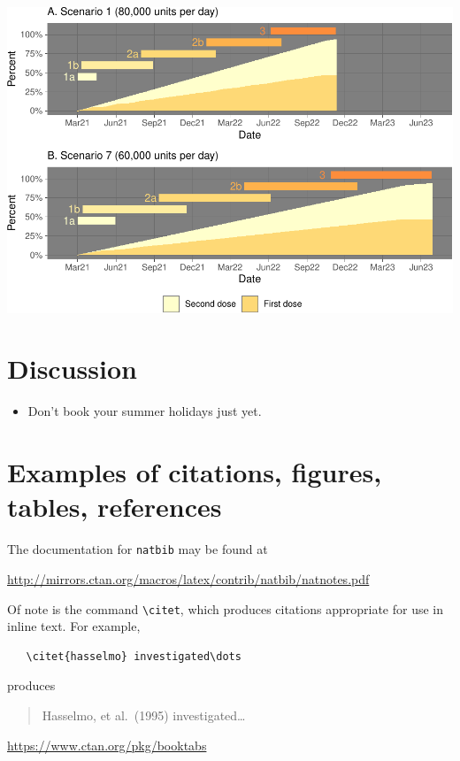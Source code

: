 \documentclass{article}
\begin{document}
\includegraphics{researchNote_files/figure-latex/unnamed-chunk-4-1.pdf}

\hypertarget{discussion}{%
\section{Discussion}\label{discussion}}

\begin{itemize}
\tightlist
\item
  Don't book your summer holidays just yet.
\end{itemize}

\hypertarget{examples-of-citations-figures-tables-references}{%
\section{Examples of citations, figures, tables,
references}\label{examples-of-citations-figures-tables-references}}

\label{sec:others}

The documentation for \verb+natbib+ may be found at

\begin{center}
  \url{http://mirrors.ctan.org/macros/latex/contrib/natbib/natnotes.pdf}
\end{center}

Of note is the command \verb+\citet+, which produces citations
appropriate for use in inline text. For example,

\begin{verbatim}
   \citet{hasselmo} investigated\dots
\end{verbatim}

produces

\begin{quote}
  Hasselmo, et al.\ (1995) investigated\dots
\end{quote}

\begin{center}
  \url{https://www.ctan.org/pkg/booktabs}
\end{center}



\end{document}
